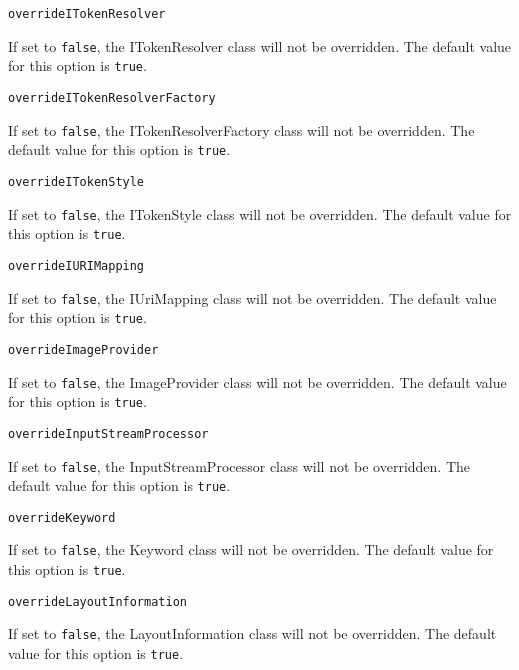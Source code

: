 \noindent\texttt{overrideITokenResolver}
\begin{myindentpar}{1cm}
If set to \texttt{false}, the ITokenResolver class will not be overridden. The default value for this option is \texttt{true}.
\end{myindentpar}

\noindent\texttt{overrideITokenResolverFactory}
\begin{myindentpar}{1cm}
If set to \texttt{false}, the ITokenResolverFactory class will not be overridden. The default value for this option is \texttt{true}.
\end{myindentpar}

\noindent\texttt{overrideITokenStyle}
\begin{myindentpar}{1cm}
If set to \texttt{false}, the ITokenStyle class will not be overridden. The default value for this option is \texttt{true}.
\end{myindentpar}

\noindent\texttt{overrideIURIMapping}
\begin{myindentpar}{1cm}
If set to \texttt{false}, the IUriMapping class will not be overridden. The default value for this option is \texttt{true}.
\end{myindentpar}

\noindent\texttt{overrideImageProvider}
\begin{myindentpar}{1cm}
If set to \texttt{false}, the ImageProvider class will not be overridden. The default value for this option is \texttt{true}.
\end{myindentpar}

\noindent\texttt{overrideInputStreamProcessor}
\begin{myindentpar}{1cm}
If set to \texttt{false}, the InputStreamProcessor class will not be overridden. The default value for this option is \texttt{true}.
\end{myindentpar}

\noindent\texttt{overrideKeyword}
\begin{myindentpar}{1cm}
If set to \texttt{false}, the Keyword class will not be overridden. The default value for this option is \texttt{true}.
\end{myindentpar}

\noindent\texttt{overrideLayoutInformation}
\begin{myindentpar}{1cm}
If set to \texttt{false}, the LayoutInformation class will not be overridden. The default value for this option is \texttt{true}.
\end{myindentpar}

